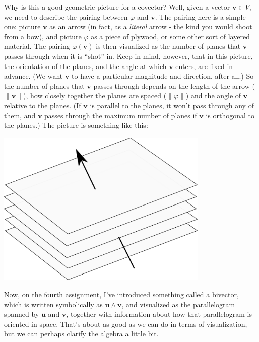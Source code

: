 \documentclass[letterpaper,12pt]{article}
\newcommand{\uu}{\mathbf{u}}
\newcommand{\vv}{\mathbf{v}}
\begin{document}
Why is this a good geometric picture for a covector? Well, given a vector $\vv\in V$, we need to describe the pairing between $\varphi$ and $\vv$. The pairing here is a simple one: picture $\vv$ as an arrow (in fact, as a {\em literal} arrow - the kind you would shoot from a bow), and picture $\varphi$ as a piece of plywood, or some other sort of layered material. The pairing $\varphi(\vv)$ is then visualized as the number of planes that $\vv$ passes through when it is ``shot'' in. Keep in mind, however, that in this picture, the orientation of the planes, and the angle at which $\vv$ enters, are fixed in advance. (We want $\vv$ to have a particular magnitude and direction, after all.) So the number of planes that $\vv$ passes through depends on the length of the arrow ($\lVert\vv\rVert$), how closely together the planes are spaced ($\lVert\varphi\rVert$) and the angle of $\vv$ relative to the planes. (If $\vv$ is parallel to the planes, it won't pass through any of them, and $\vv$ passes through the maximum number of planes if $\vv$ is orthogonal to the planes.) The picture is something like this:
\begin{center}
\includegraphics[width=4in]{covector.pdf}
\end{center}
Now, on the fourth assignment, I've introduced something called a bivector, which is written symbolically as $\uu\wedge\vv$, and visualized as the parallelogram spanned by $\uu$ and $\vv$, together with information about how that parallelogram is oriented in space. That's about as good as we can do in terms of visualization, but we can perhaps clarify the algebra a little bit.
\end{document}
